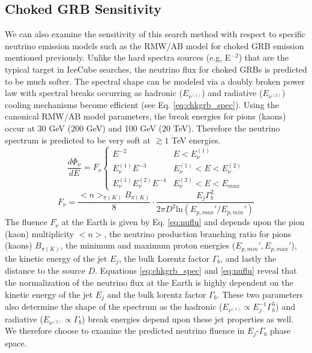 \documentclass[manuscript]{aastex}
\begin{document}
\subsection{Choked GRB Sensitivity}
We can also examine the sensitivity of this search method with respect to specific neutrino emission models such as the RMW/AB model for choked GRB emission mentioned previously. Unlike the hard spectra sources (e.g, E$^{-2}$) that are the typical target in IceCube searches, the neutrino flux for choked GRBs is predicted to be much softer. The spectral shape can be modeled via a doubly broken power law with spectral breaks occurring as hadronic ($E_{\nu^{(1)}}$) and radiative ($E_{\nu^{(2)}}$) cooling mechanisms become efficient (see Eq. \ref{eq:chkgrb_spec}). Using the canonical RMW/AB model parameters, the break energies for pions (kaons) occur at 30 GeV (200 GeV) and 100 GeV (20 TeV). Therefore the neutrino spectrum is predicted to be very soft at $\gtrsim 1$ TeV energies.
\begin{equation}\label{eq:chkgrb_spec}
\frac{d\Phi_\nu}{dE}=F_\nu\left\{\begin{array}{cc}
E^{-2} & E < E_{\nu}^{(1)} \\ 
E_{\nu}^{(1)}E^{-3} & E_{\nu}^{(1)}< E < E_{\nu}^{(2)} \\ 
E_{\nu}^{(1)}E_{\nu}^{(2)}E^{-4} & E_{\nu}^{(2)}< E < E_{max}
\end{array}\right.
\end{equation}
\begin{equation}\label{eq:nuflu}
F_{\nu} = \frac{<n>_{\pi(K)}B_{\pi(K)}}{8} \cdot \frac{E_j \Gamma_b^2}{2 \pi D^2 \textrm{ln}(E_{p,max}'/ E_{p,min}')}
\end{equation}
The fluence $F_\nu$ at the Earth is given by Eq. \ref{eq:nuflu} and depends upon the pion (kaon) multiplicity $<n>$, the neutrino production branching ratio for pions (kaons) $B_{\pi(K)}$, the minimum and maximum proton energies ($E_{p,min}', E_{p,max}'$), the kinetic energy of the jet $E_j$, the bulk Lorentz factor $\Gamma_b$, and lastly the distance to the source $D$. Equations \ref{eq:chkgrb_spec} and \ref{eq:nuflu} reveal that the normalization of the neutrino flux at the Earth is highly dependent on the kinetic energy of the jet $E_j$ and the bulk lorentz factor $\Gamma_b$. These two parameters also determine the shape of the spectrum as the hadronic ($E_{\nu^{(1)}}\propto E_j^{-1} \Gamma_b^5$) and radiative ($E_{\nu^{(2)}}\propto \Gamma_b$) break energies depend upon these jet properties as well. We therefore choose to examine the predicted neutrino fluence in $E_j$-$\Gamma_b$ phase space. 
\end{document}
